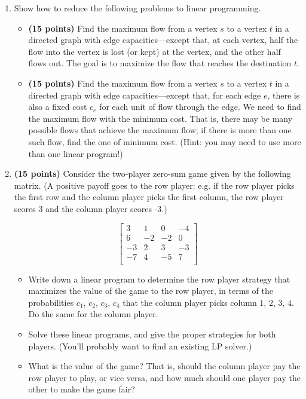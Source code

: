 \documentclass[11pt]{article}
\begin{document}
\begin{enumerate}
\item
Show how to reduce the following problems to linear programming.
\begin{itemize}
\item 
{\bf (15 points)}
Find the maximum flow from a vertex $s$ to a vertex $t$ in 
a directed graph with edge capacities---except that,
at each vertex, half the flow into the vertex is lost (or
kept) at the vertex, and the other half flows out.  The goal
is to maximize the flow that reaches the destination $t$.
\item 
{\bf (15 points)}
Find the maximum flow from a vertex $s$ to a vertex $t$ in 
a directed graph with edge capacities---except that,
for each edge $e$, there is also a fixed cost $c_e$ for each
unit of flow through the edge.  We need to find the maximum flow
with the minimum cost.  That is, there may be many possible flows
that achieve the maximum flow;  if there is more than one such flow,
find the one of minimum cost.
(Hint: you may need to use more than one linear program!)
\end{itemize}

\item 
{\bf (15 points)}
Consider the two-player zero-sum game given by the following matrix.  (A positive
payoff goes to the row player: e.g. if the row player picks the first row and the column player
picks the first column, the row player scores 3 and the column player scores -3.)

$$\left[\begin{array}{cccc}
3 & 1 & 0 & -4  \\
6 & -2 & -2 & 0 \\
-3 & 2 & 3 & -3 \\
-7 & 4 & -5 & 7 \\
\end{array}
\right]
$$
\begin{itemize}
\item Write down a linear program to determine the row player
strategy that maximizes the value of the game to the row player,
in terms of the probabilities $c_1$, $c_2$, $c_3$, $c_4$ that the
column player picks column $1$, $2$, $3$, $4$.
Do the same for the column player.
\item Solve these linear programs, and give the proper strategies
for both players. (You'll probably want to find an existing LP solver.)
\item What is the value of the game? That is, should the column player
pay the row player to play, or vice versa, and how much should
one player pay the other to make the game fair?
\end{itemize}


\end{enumerate}
\end{document}
